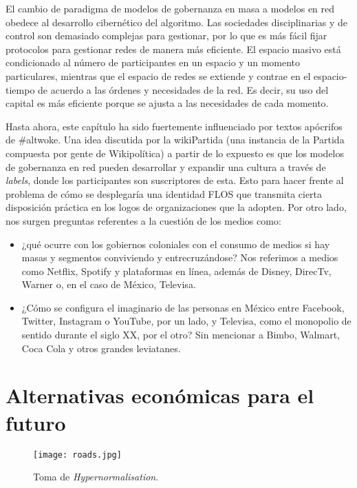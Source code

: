 El cambio de paradigma de modelos de gobernanza en masa a modelos en red obedece al desarrollo cibernético del algoritmo. Las sociedades disciplinarias y de control son demasiado complejas para gestionar, por lo que es más fácil fijar protocolos para gestionar redes de manera más eficiente. El espacio masivo está condicionado al número de participantes en un espacio y un momento particulares, mientras que el espacio de redes se extiende y contrae en el espacio-tiempo de acuerdo a las órdenes y necesidades de la red. Es decir, su uso del capital es más eficiente porque se ajusta a las necesidades de cada momento.

Hasta ahora, este capítulo ha sido fuertemente influenciado por textos apócrifos de \#altwoke. Una idea discutida por la wikiPartida (una instancia de la Partida compuesta por gente de Wikipolítica) a partir de lo expuesto es que los modelos de gobernanza en red pueden desarrollar y expandir una cultura a través de \emph{labels}, donde los participantes son suscriptores de esta. Esto para hacer frente al problema de cómo se desplegaría una identidad FLOS que transmita cierta disposición práctica en los logos de organizaciones que la adopten. Por otro lado, nos surgen preguntas referentes a la cuestión de los medios como:

\begin{itemize}
	\item ¿qué ocurre con los gobiernos coloniales con el consumo de medios si hay masas y segmentos conviviendo y entrecruzándose? Nos referimos a medios como Netflix, Spotify y plataformas en línea, además de Disney, DirecTv, Warner o, en el caso de México, Televisa.
	\item ¿Cómo se configura el imaginario de las personas en México entre Facebook, Twitter, Instagram o YouTube, por un lado, y Televisa, como el monopolio de sentido durante el siglo XX, por el otro? Sin mencionar a Bimbo, Walmart, Coca Cola y otros grandes leviatanes.
\end{itemize}

\section{Alternativas económicas para el futuro}
\label{sec:altfutur}

\begin{figure}[htbp]
	\centering
	\texttt{[image: roads.jpg]}
	\caption[\emph{Hypernormalisation}]{Toma de \emph{Hypernormalisation}.}
	\label{fig:hypernormalisation2}
\end{figure}


